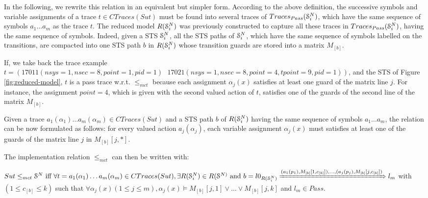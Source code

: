 In the following, we rewrite this relation in an equivalent but
simpler form. According to the above definition, the successive
symbols and variable assignments of a trace $t \in
CTraces({Sut})$ must be found into several traces of
$Traces_{Pass}(\EuScript{S}_i^{N})$, which have the same sequence
of symbols $a_1...a_m$ as the trace $t$. The reduced model
$R(\EuScript{S}_i^{N})$ was previously constructed to capture
all these traces in $Traces_{Pass}(\EuScript{S}_i^{N})$, having
the same sequence of symbols. Indeed, given a STS
$\EuScript{S}_i^{N}$, all the STS paths of $\EuScript{S}_i^{N}$,
which have the same sequence of symbols labelled on the
transitions, are compacted into one STS path $b$ in
$R(\EuScript{S}_i^{N})$ whose transition guards are stored into a
matrix $M_{[b]}$.

If, we take back the trace example
$t=(17011(nsys=1,nsec=8,point=1,pid=1)\text{ }
17021(nsys=1,nsec=8,point=4,tpoint=9,pid=1))$, and the STS of
Figure \ref{fig:reduced-model}, $t$ is a pass trace w.r.t.
$\leq_{mct}$ because each assignment $\alpha_j(x)$ satisfies at
least one guard of the matrix line $j$. For instance, the
assignment $point=4$, which is given with the second valued
action of $t$, satisfies one of the guards of the second line of
the matrix $M_{[b]}$.

Given a trace $a_1(\alpha_1) \dots a_m(\alpha_m) \in CTraces({Sut})$
and a STS path $b$ of $R(\EuScript{S}_i^{N})$ having the same
sequence of symbols $a_1 \dots a_m$, the relation can be now
formulated as follows: for every valued action $a_j(\alpha_j)$,
each variable assignment $\alpha_j(x)$ must satisfies at least
one of the guards of the matrix line $j$ in $M_{[b]}[j,*]$.

The implementation relation $\leq_{mct}$ can then be written with:

\begin{proposition}
	${Sut} \leq_{mct} \EuScript{S}^{N} \text{ iff } \forall t=
	a_1(\alpha_1) \dots a_m(\alpha_m) \in CTraces({Sut}), \exists
	R(\EuScript{S}_i^{N}) \in R(\EuScript{S}^{N)} \text{ and }
	b=l0_{R(\EuScript{S}_i^{N})} \xRightarrow{(a_1(p_1),M_{[b]}[1,c_{[b]}]),\dots,(a_j(p_j),M_{[b]}[j,c_{[b]}])} l_m$ with $(1 \leq c_{[b]} \leq k)$ such that $\forall \alpha_j(x) (1 \leq j \leq m), \alpha_j(x) \models M_{[b]}[j,1] \vee \dots \vee  M_{[b]}[j,k]$ and $l_m \in Pass$.
\end{proposition}

